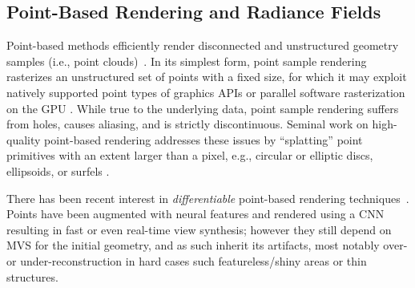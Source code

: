 \subsection{Point-Based Rendering and Radiance Fields}




Point-based methods efficiently render disconnected and unstructured geometry samples (i.e., point clouds)~\cite{gross2011point}. 
In its simplest form, point sample rendering \cite{Grossman1998PointSR} rasterizes an unstructured set of points with a fixed size, for which it may exploit natively supported point types of graphics APIs \cite{SAINZ2004869} or parallel software rasterization on the GPU \cite{10.1145/3543863, laine2011high}. While true to the underlying data, point sample rendering suffers from holes, causes aliasing, and is strictly discontinuous. Seminal work on high-quality point-based rendering addresses these issues by “splatting” point primitives with an extent larger than a pixel, e.g., circular or elliptic discs, ellipsoids, or surfels \cite{10.1145/383259.383300, 10.5555/2386366.2386369,  Ren2002ObjectSE, 10.1145/344779.344936}.

There has been recent interest in \emph{differentiable} point-based rendering techniques~\cite{yifan19,wiles2020synsin}. Points have been augmented with neural features and rendered using a CNN~\cite{ruckert22,aliev20} resulting in fast or even real-time view synthesis; however they still depend on MVS for the initial geometry, and as such inherit its artifacts, most notably over- or under-reconstruction in hard cases such  featureless/shiny areas or thin structures. 


